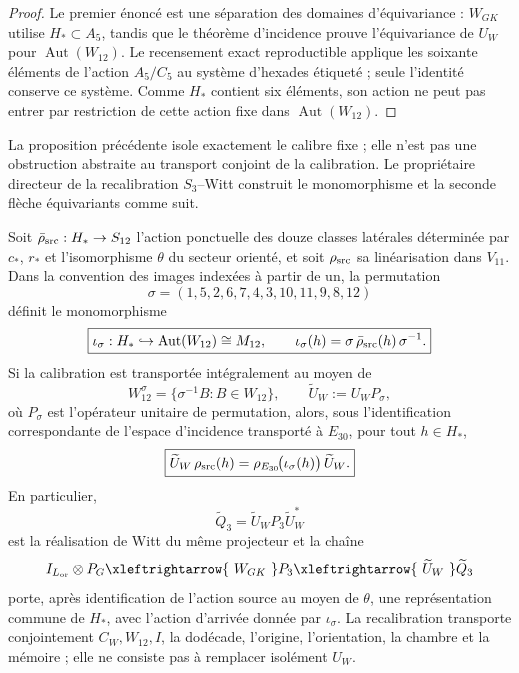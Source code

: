 \begin{proof}
Le premier énoncé est une séparation des domaines d'équivariance :
\(W_{GK}\) utilise \(H_*\subset A_5\), tandis que le théorème d'incidence
prouve l'équivariance de \(U_W\) pour
\(\operatorname{Aut}(W_{12})\). Le recensement exact reproductible applique les soixante
éléments de l'action \(A_5/C_5\) au système d'hexades étiqueté ; seule
l'identité conserve ce système. Comme \(H_*\) contient six éléments, son
action ne peut pas entrer par restriction de cette action fixe dans
\(\operatorname{Aut}(W_{12})\).
\end{proof}

La proposition précédente isole exactement le calibre fixe ; elle n'est pas une
obstruction abstraite au transport conjoint de la calibration. Le
propriétaire directeur de la recalibration \(S_3\)--Witt construit le monomorphisme et
la seconde flèche équivariants comme suit.

\begin{theorem}
\label{thm:recalibracion-hstar-witt}
Soit
\(\bar\rho_{\rm src}:H_*\to S_{12}\) l'action ponctuelle des douze classes
latérales déterminée par \(c_*\), \(r_*\) et l'isomorphisme \(\theta\) du
secteur orienté, et soit \(\rho_{\rm src}\) sa linéarisation dans \(V_{11}\).
Dans la convention des images indexées à partir de un, la permutation
\[
 \boxed{\sigma=(1,5,2,6,7,4,3,10,11,9,8,12)}
\]
définit le monomorphisme
\[
 \boxed{
 \iota_\sigma:H_*\hookrightarrow\operatorname{Aut}(W_{12})\cong M_{12},
 \qquad
 \iota_\sigma(h)=
 \sigma\,\bar\rho_{\rm src}(h)\,\sigma^{-1}.
 }
\]
Si la calibration est transportée intégralement au moyen de
\[
 W_{12}^{\sigma}=\{\sigma^{-1}B:B\in W_{12}\},
 \qquad
 \widetilde U_W:=U_WP_\sigma,
\]
où \(P_\sigma\) est l'opérateur unitaire de permutation, alors, sous
l'identification correspondante de l'espace d'incidence transporté à
\(E_{30}\), pour tout \(h\in H_*\),
\[
 \boxed{
 \widetilde U_W\,\rho_{\rm src}(h)
 =\rho_{E_{30}}\!\bigl(\iota_\sigma(h)\bigr)\,\widetilde U_W.
 }
\]
En particulier,
\[
 \widetilde Q_3=\widetilde U_WP_3\widetilde U_W^*
\]
est la réalisation de Witt du même projecteur et la chaîne
\[
 I_{L_{\rm or}}\otimes P_G
 \xleftrightarrow{\ W_{GK}\ }
 P_3
 \xleftrightarrow{\ \widetilde U_W\ }
 \widetilde Q_3
\]
porte, après identification de l'action source au moyen de \(\theta\), une
représentation commune de \(H_*\), avec l'action d'arrivée donnée par
\(\iota_\sigma\). La recalibration transporte conjointement
\(C_W,W_{12},I\), la dodécade, l'origine, l'orientation, la chambre et la
mémoire ; elle ne consiste pas à remplacer isolément \(U_W\).
\end{theorem}


